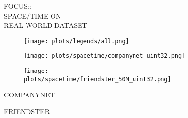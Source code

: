 \documentclass{article}
\begin{document}
\begin{figure}[!htbp]
\fbox
{
\begin{minipage}[t][0.98\textheight][t]{\textwidth}
\centering
    \begin{minipage}{0.23\linewidth}
    \footnotesize{FOCUS::\\ SPACE/TIME ON \\ REAL-WORLD DATASET}
    \end{minipage}
   \begin{minipage}{0.75\linewidth}
        \begin{figure}[H]
        \texttt{[image: plots/legends/all.png]}
        \end{figure}
    \end{minipage}
   \vfill 

   \begin{minipage}{0.48\linewidth}
        \begin{figure}[H]
        \texttt{[image: plots/spacetime/companynet\_uint32.png]}
        \end{figure}
    \end{minipage}
    \begin{minipage}{0.48\linewidth}
        \begin{figure}[H]
        \texttt{[image: plots/spacetime/friendster\_50M\_uint32.png]}
        \end{figure}
    \end{minipage}
    \begin{minipage}{0.48\linewidth}
    \begin{center}
        COMPANYNET
    \end{center}
    \end{minipage}
    \begin{minipage}{0.48\linewidth}
    \begin{center}
        FRIENDSTER
    \end{center}
    \end{minipage}
    
    \vfill


\end{minipage}}
\end{figure}
\end{document}
